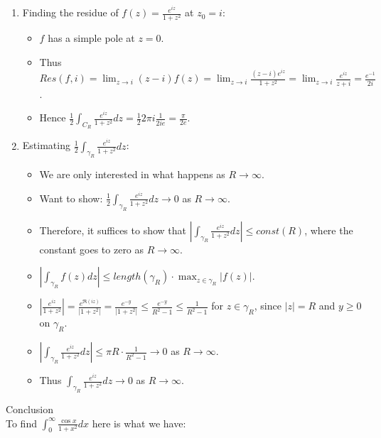 \documentclass{article}
\begin{document}
\begin{enumerate}
\item Finding the residue of $f(z) = \frac{e^{iz}}{1+z^2}$ at $z_0= i$:
\begin{itemize}
\item $f$ has a simple pole at $z = 0$.
\item Thus $Res(f,i) = \lim_{z \to i} (z-i)f(z) = \lim_{z \to i} \frac{(z-i)e^{iz}}{1+z^2} = \lim_{z \to i} \frac{e^{iz}}{z + i} = \frac{e^{-1}}{2i}$.
\item Hence $\frac{1}{2} \int_{C_R} \frac{e^{iz}}{1+z^2}dz = \frac{1}{2}2\pi i\frac{1}{2ie} = \frac{\pi}{2e}$.
\end{itemize}
\item Estimating $\frac{1}{2} \int_{\gamma_R}\frac{e^{iz}}{1+z^2}dz$:
\begin{itemize}
\item We are only interested in what happens as $R \to \infty$.
\item Want to show: $\frac{1}{2} \int_{\gamma_R} \frac{e^{iz}}{1+z^2}dz \to 0$ as $R \to \infty$.
\item Therefore, it suffices to show that $\left|\int_{\gamma_R} \frac{e^{iz}}{1+z^2}dz\right| \leq const(R)$, where the constant goes to zero as $R \to \infty$.
\item $\left|\int_{\gamma_R}f(z)dz\right| \leq length(\gamma_R) \cdot \max_{z \in \gamma_R} \left|f(z)\right|$.
\item $\left| \frac{e^{iz}}{1+z^2}\right| = \frac{e^{\Re (iz)}}{\left|1+z^2\right|} = \frac{e^{-y}}{\left|1+z^2\right|} \leq \frac{e^{-y}}{R^2-1} \leq \frac{1}{R^2-1}$ for $z \in \gamma_R$, since $\left|z\right| = R$ and $y \geq 0$ on $\gamma_R$.
\item $\left|\int_{\gamma_R} \frac{e^{iz}}{1+z^2}dz\right| \leq \pi R \cdot \frac{1}{R^2 - 1} \to 0$ as $R \to \infty$.
\item Thus $\int_{\gamma_R} \frac{e^{iz}}{1+z^2}dz \to 0$ as $R \to \infty$.
\end{itemize}
\end{enumerate}
Conclusion \\
To find $\int_0^{\infty} \frac{\cos x}{1+x^2}dx$ here is what we have:
\end{document}
